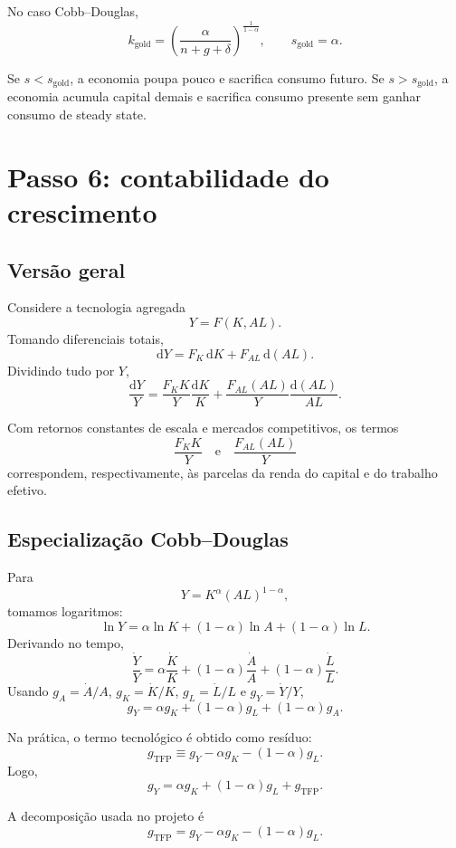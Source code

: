 \documentclass[11pt,a4paper]{article}
\newcommand{\dd}{\mathrm{d}}
\begin{document}
\begin{resultado}
No caso Cobb--Douglas,
\[
k_{\text{gold}}=
\left(\frac{\alpha}{n+g+\delta}\right)^{\frac{1}{1-\alpha}},
\qquad
s_{\text{gold}}=\alpha.
\]
\end{resultado}

\begin{intuicao}
Se \(s<s_{\text{gold}}\), a economia poupa pouco e sacrifica consumo futuro.
Se \(s>s_{\text{gold}}\), a economia acumula capital demais e sacrifica consumo
presente sem ganhar consumo de steady state.
\end{intuicao}

\section{Passo 6: contabilidade do crescimento}

\subsection{Vers\~ao geral}

Considere a tecnologia agregada
\[
Y=F(K,AL).
\]
Tomando diferenciais totais,
\[
\dd Y = F_K\,\dd K + F_{AL}\,\dd(AL).
\]
Dividindo tudo por \(Y\),
\[
\frac{\dd Y}{Y}
=
\frac{F_K K}{Y}\frac{\dd K}{K}
+
\frac{F_{AL}(AL)}{Y}\frac{\dd(AL)}{AL}.
\]

Com retornos constantes de escala e mercados competitivos, os termos
\[
\frac{F_K K}{Y}
\quad\text{e}\quad
\frac{F_{AL}(AL)}{Y}
\]
correspondem, respectivamente, \`as parcelas da renda do capital e do trabalho
efetivo.

\subsection{Especializa\c{c}\~ao Cobb--Douglas}

Para
\[
Y=K^\alpha(AL)^{1-\alpha},
\]
tomamos logaritmos:
\[
\ln Y=\alpha \ln K + (1-\alpha)\ln A + (1-\alpha)\ln L.
\]
Derivando no tempo,
\[
\frac{\dot Y}{Y}
=
\alpha\frac{\dot K}{K}
+
(1-\alpha)\frac{\dot A}{A}
+
(1-\alpha)\frac{\dot L}{L}.
\]
Usando \(g_A=\dot A/A\), \(g_K=\dot K/K\), \(g_L=\dot L/L\) e \(g_Y=\dot Y/Y\),
\[
g_Y=\alpha g_K+(1-\alpha)g_L+(1-\alpha)g_A.
\]

Na pr\'atica, o termo tecnol\'ogico \'e obtido como res\'iduo:
\[
g_{\text{TFP}}
\equiv
g_Y-\alpha g_K-(1-\alpha)g_L.
\]
Logo,
\[
g_Y=\alpha g_K+(1-\alpha)g_L+g_{\text{TFP}}.
\]

\begin{resultado}
A decomposi\c{c}\~ao usada no projeto \'e
\[
g_{\text{TFP}}=g_Y-\alpha g_K-(1-\alpha)g_L.
\]
\end{resultado}
\end{document}
